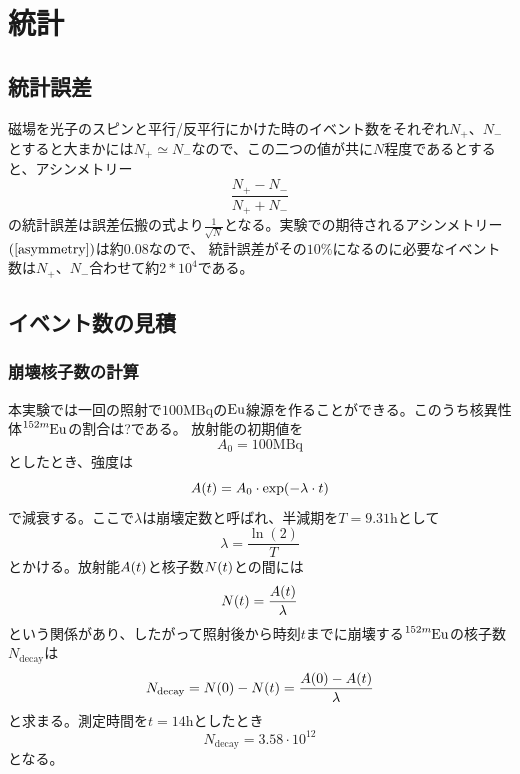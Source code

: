 \documentclass[dvipdfmx]{jreport}
\begin{document}
\chapter{統計}

\section{統計誤差}
磁場を光子のスピンと平行/反平行にかけた時のイベント数をそれぞれ$N_{+}$、$N_{-}$とすると大まかには$N_{+} \simeq N_{-}$なので、この二つの値が共に$N$程度であるとすると、アシンメトリー
\begin{equation}
  \label{asymmetry}
  \frac{N_{+} - N_{-}}{N_{+} + N_{-}}
\end{equation}
の統計誤差は誤差伝搬の式より$\frac{1}{\sqrt{N}}$となる。実験での期待されるアシンメトリー$\qty(\ref{asymmetry})$は約$0.08$なので、
統計誤差がその$10\%$になるのに必要なイベント数は$N_{+}$、$N_{-}$合わせて約$2*10^{4}$である。

\section{イベント数の見積}
\subsection{崩壊核子数の計算}
本実験では一回の照射で$100\mathrm{MBq}$の$\ce{Eu}$線源を作ることができる。このうち核異性体$\ce{^{152m}Eu}$の割合は?である。
放射能の初期値を
\begin{equation}
  A_0 = 100\mathrm{MBq}
\end{equation}
としたとき、強度は
\begin{equation}
  A\qty(t) = A_0 \cdot \exp(-\lambda \cdot t)
\end{equation}
で減衰する。ここで$\lambda$は崩壊定数と呼ばれ、半減期を$T=9.31\mathrm{h}$として
\begin{equation}
  \lambda = \frac{\ln(2)}{T}
\end{equation}
とかける。放射能$A\qty(t)$と核子数$N\qty(t)$との間には
\begin{equation}
  N\qty(t) = \frac{A\qty(t)}{\lambda}
\end{equation}
という関係があり、したがって照射後から時刻$t$までに崩壊する$\ce{^{152m}Eu}$の核子数$N_{\mathrm{decay}}$は
\begin{equation}
  N_{\mathrm{decay}} = N\qty(0) - N\qty(t) = \frac{A\qty(0) - A\qty(t)}{\lambda}
\end{equation}
と求まる。測定時間を$t=14\mathrm{h}$としたとき
\begin{equation}
  N_{\mathrm{decay}} = 3.58 \cdot 10^{12}
\end{equation}
となる。
\end{document}
